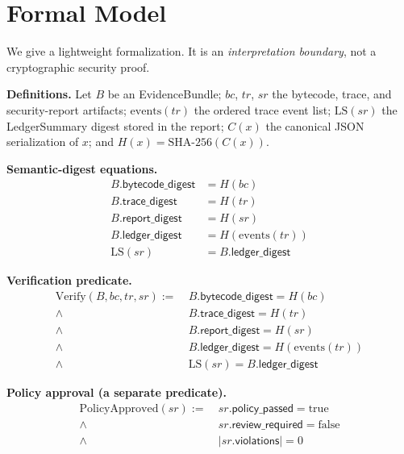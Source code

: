 \documentclass[conference]{IEEEtran}
\begin{document}
\section{Formal Model}\label{sec:formal}
We give a lightweight formalization. It is an \emph{interpretation boundary}, not a
cryptographic security proof.

\noindent\textbf{Definitions.} Let $B$ be an EvidenceBundle; $bc$, $tr$, $sr$ the
bytecode, trace, and security-report artifacts; $\mathrm{events}(tr)$ the ordered trace
event list; $\mathrm{LS}(sr)$ the LedgerSummary digest stored in the report; $C(x)$ the
canonical JSON serialization of $x$; and $H(x)=\mathrm{SHA\text{-}256}(C(x))$.

\noindent\textbf{Semantic-digest equations.}
\begin{align}
B.\textsf{bytecode\_digest} &= H(bc) \\
B.\textsf{trace\_digest}    &= H(tr) \\
B.\textsf{report\_digest}   &= H(sr) \\
B.\textsf{ledger\_digest}   &= H(\mathrm{events}(tr)) \\
\mathrm{LS}(sr)             &= B.\textsf{ledger\_digest}
\end{align}

\noindent\textbf{Verification predicate.}
\begin{align*}
\mathrm{Verify}(B,bc,tr,sr) :=\ &
B.\textsf{bytecode\_digest} = H(bc) \\
\wedge\ & B.\textsf{trace\_digest} = H(tr) \\
\wedge\ & B.\textsf{report\_digest} = H(sr) \\
\wedge\ & B.\textsf{ledger\_digest} = H(\mathrm{events}(tr)) \\
\wedge\ & \mathrm{LS}(sr) = B.\textsf{ledger\_digest}
\end{align*}

\noindent\textbf{Policy approval (a separate predicate).}
\begin{align*}
\mathrm{PolicyApproved}(sr) :=\ &
sr.\textsf{policy\_passed} = \mathrm{true} \\
\wedge\ & sr.\textsf{review\_required} = \mathrm{false} \\
\wedge\ & |sr.\textsf{violations}| = 0
\end{align*}
\end{document}

